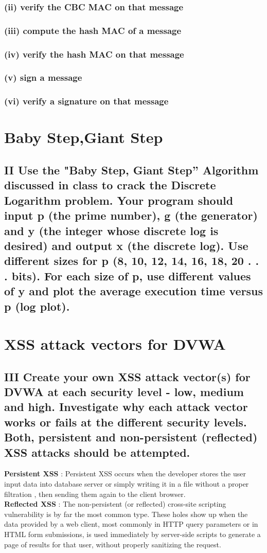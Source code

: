\documentclass{article}
\begin{document}
\subsubsection{(ii) verify the CBC MAC on that message}
\subsubsection{(iii) compute the hash MAC of a message}
\subsubsection{(iv) verify the hash MAC on that message}
\subsubsection{(v) sign a message}
\subsubsection{(vi) verify a signature on that message}

\section{Baby Step,Giant Step}
\subsection{II Use the "Baby Step, Giant Step” Algorithm discussed in class to crack the
Discrete Logarithm problem. Your program should input p (the prime number), g
(the generator) and y (the integer whose discrete log is desired) and output x
(the discrete log). Use different sizes for p (8, 10, 12, 14, 16, 18, 20 . . . bits).
For each size of p, use different values of y and plot the average execution time
versus p (log plot).}

\section{XSS attack vectors for DVWA}
\subsection{III Create your own XSS attack vector(s) for DVWA at each security level - low,
medium and high. Investigate why each attack vector works or fails at the
different security levels. Both, persistent and non-persistent (reflected) XSS
attacks should be attempted.}
\textbf{Persistent XSS} : Persistent XSS occurs when the developer stores the user input data into database server
or simply writing it in a file without a proper filtration , then sending them again to the client
browser.\\
\textbf{Reflected XSS} : The non-persistent (or reflected) cross-site scripting vulnerability is by far the
most common type. These holes show up when the data provided by a web client, most commonly
in HTTP query parameters or in HTML form submissions, is used immediately by server-side scripts
to generate a page of results for that user, without properly sanitizing the request.\\
\end{document}

